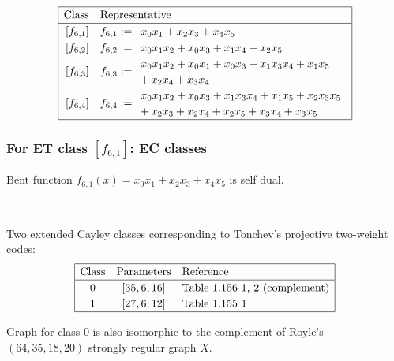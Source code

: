 \documentclass[pdf,sprung,slideColor,nocolorBG]{beamer}
\newenvironment{colortheme}[1]{
\def\ProvidesPackageRCS $##1${\relax}
\renewcommand{\ProcessOptions}{\relax}
\makeatletter

\makeatother
}{}
\begin{document}
\begin{colortheme}{jubata}
\begin{frame}
\begin{align*}
\def\arraystretch{1.2}
\begin{array}{|cl|}
\hline
\text{Class} &
\text{Representative}
\\
\hline
\,[f_{6,1}] & f_{6,1} :=
\begin{array}{l}
x_{0} x_{1} + x_{2} x_{3} + x_{4} x_{5}
\end{array}
\\
\,[f_{6,2}] & f_{6,2} :=
\begin{array}{l}
x_{0} x_{1} x_{2} + x_{0} x_{3} + x_{1} x_{4} + x_{2} x_{5}
\end{array}
\\
\,[f_{6,3}] & f_{6,3} :=
\begin{array}{l}
x_{0} x_{1} x_{2} + x_{0} x_{1} + x_{0} x_{3} + x_{1} x_{3} x_{4} + x_{1} x_{5}
\\
 +\, x_{2} x_{4} + x_{3} x_{4}
\end{array}
\\
\,[f_{6,4}] & f_{6,4} :=
\begin{array}{l}
x_{0} x_{1} x_{2} + x_{0} x_{3} + x_{1} x_{3} x_{4} + x_{1} x_{5} + x_{2} x_{3} x_{5}
\\
 +\, x_{2} x_{3} + x_{2} x_{4} + x_{2} x_{5} + x_{3} x_{4} + x_{3} x_{5}
\end{array}
\\
\hline
\end{array}
\end{align*}
\end{frame}
\begin{frame}
\frametitle{For ET class $[f_{6,1}]$: EC classes}

Bent function
$f_{6,1}(x) = x_0 x_1 + x_2 x_3 + x_4 x_5$ is self dual.

 ~

Two extended Cayley classes corresponding to Tonchev's projective two-weight codes:
\begin{align*}
\def\arraystretch{1.2}
\begin{array}{|ccl|}
\hline
\text{Class} &
\text{Parameters} & \text{Reference}
\\
\hline
0 & [35,6,16] & \text{Table 1.156 1, 2 (complement)}
\\
1 & [27,6,12] & \text{Table 1.155 1 }
\\
\hline
\end{array}
\end{align*}

Graph for class 0 is also isomorphic to the complement of Royle's $(64,35,18,20)$ strongly regular
graph $X$.


\end{frame}
\end{colortheme}
\end{document}
